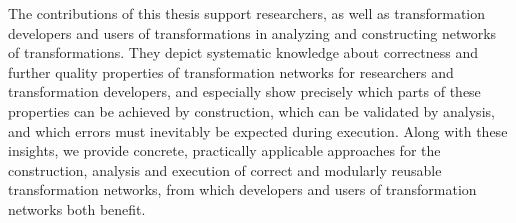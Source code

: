 The contributions of this thesis support researchers, as well as transformation developers and users of transformations in analyzing and constructing networks of transformations.
They depict systematic knowledge about correctness and further quality properties of transformation networks for researchers and transformation developers, and especially show precisely which parts of these properties can be achieved by construction, which can be validated by analysis, and which errors must inevitably be expected during execution. 
Along with these insights, we provide concrete, practically applicable approaches for the construction, analysis and execution of correct and modularly reusable transformation networks, from which developers and users of transformation networks both benefit.